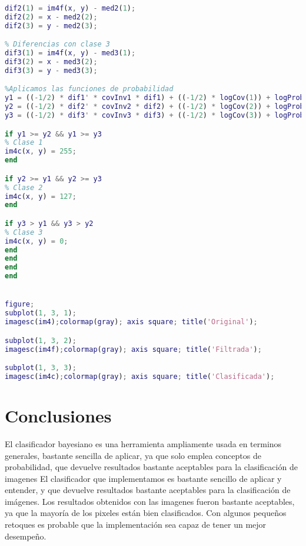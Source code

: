 \documentclass[10pt,journal,compsoc]{IEEEtran}\usepackage[T1]{fontenc}                              %
\begin{document}
\begin{lstlisting}[language=Matlab,basicstyle=\small]
% Diferencias con clase 2
dif2(1) = im4f(x, y) - med2(1);
dif2(2) = x - med2(2);
dif2(3) = y - med2(3);

% Diferencias con clase 3
dif3(1) = im4f(x, y) - med3(1);
dif3(2) = x - med3(2);
dif3(3) = y - med3(3);

%Aplicamos las funciones de probabilidad
y1 = ((-1/2) * dif1' * covInv1 * dif1) + ((-1/2) * logCov(1)) + logProb(1);
y2 = ((-1/2) * dif2' * covInv2 * dif2) + ((-1/2) * logCov(2)) + logProb(2);
y3 = ((-1/2) * dif3' * covInv3 * dif3) + ((-1/2) * logCov(3)) + logProb(3);

if y1 >= y2 && y1 >= y3
% Clase 1
im4c(x, y) = 255;
end

if y2 >= y1 && y2 >= y3
% Clase 2
im4c(x, y) = 127;
end

if y3 > y1 && y3 > y2
% Clase 3
im4c(x, y) = 0;
end
end
end
end


figure;
subplot(1, 3, 1);
imagesc(im4);colormap(gray); axis square; title('Original');

subplot(1, 3, 2);
imagesc(im4f);colormap(gray); axis square; title('Filtrada');

subplot(1, 3, 3);
imagesc(im4c);colormap(gray); axis square; title('Clasificada');

\end{lstlisting}
\section{Conclusiones}

El clasificador bayesiano es una herramienta ampliamente usada en terminos generales, bastante sencilla de aplicar, ya que solo emplea conceptos de probabilidad, que devuelve resultados bastante aceptables para la clasificación de imagenes
El clasificador que implementamos es bastante sencillo de aplicar y entender, y  que devuelve resultados bastante aceptables para la clasificación de imágenes.
Los resultados obtenidos con las imagenes fueron bastante aceptables, ya que la mayoría de los pixeles están bien clasificados. Con algunos pequeños retoques es probable que la implementación sea capaz de tener un mejor desempeño.


\end{document}
